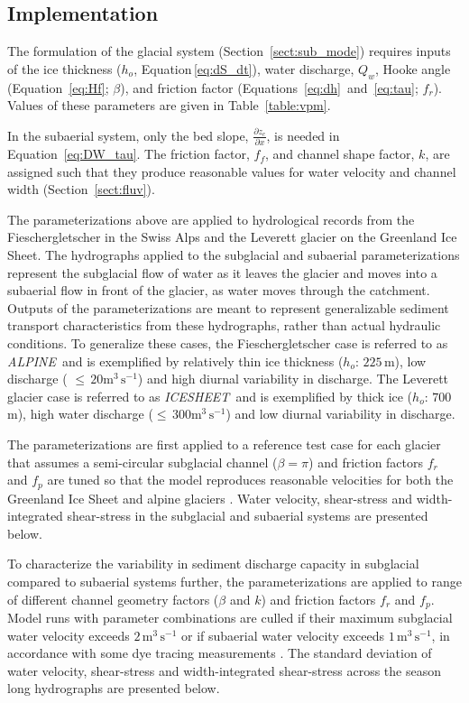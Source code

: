 \documentclass[11pt]{article}
\newcommand{\alpine}{\textit{ALPINE}\,}
\newcommand{\icesheet}{\textit{ICESHEET}\,}
\newcommand{\unit}[1]{$\mathrm{#1}$}
\begin{document}
\subsection{Implementation}

The formulation of the glacial system (Section~\ref{sect:sub_mode}) requires inputs of the ice thickness ($h_o$, Equation\,\ref{eq:dS_dt}), water discharge, $Q_w$,  Hooke angle (Equation~\ref{eq:Hf}; $\beta$), and friction factor (Equations~\ref{eq:dh}~and~\ref{eq:tau}; $f_r$). Values of these parameters are given in Table~\ref{table:vpm}.

In the subaerial system,  only the bed slope, $\frac{\partial z_c}{\partial x}$, is needed in Equation~\ref{eq:DW_tau}. The friction factor, $f_f$, and channel shape factor, $k$, are assigned such that they produce reasonable values for water velocity and channel width  (Section~\ref{sect:fluv}).

The parameterizations above are applied to hydrological records from the Fieschergletscher in the Swiss Alps and the Leverett glacier on the Greenland Ice Sheet.
The hydrographs applied to the subglacial and subaerial parameterizations represent the subglacial flow of water as it leaves the glacier and moves into a subaerial flow in front of the glacier, as water moves through the catchment.
Outputs of the parameterizations are meant to represent generalizable sediment transport characteristics from these hydrographs, rather than actual hydraulic conditions.
To generalize these cases, the Fieschergletscher case is referred to as \alpine{} and is exemplified by relatively thin ice thickness ($h_o$: $225$\,\unit{m}), low discharge ( $\le\,20$\unit{m}$^3$\,\unit{s}$^{-1}$) and high diurnal variability in discharge.
The Leverett glacier case is referred to as \icesheet{} and is exemplified by thick ice  ($h_o$: $700$\,\unit{m}), high water discharge ($\le\,300$\unit{m}$^3$\,\unit{s}$^{-1}$)  and low diurnal variability in discharge.

The parameterizations are first applied to a reference test case for each glacier that assumes a semi-circular subglacial channel ($\beta=\pi$) and friction factors $f_r$ and $f_p$ are tuned so that the model reproduces reasonable velocities for both  the Greenland Ice Sheet and alpine glaciers \citep[$\sim\,1.6\,$\unit{m}$^3$\,\unit{s}$^{-1}$][]{werder2010b,chandler2013}.
Water velocity, shear-stress and width-integrated shear-stress in the subglacial and subaerial systems are presented below.

To characterize the variability in sediment discharge capacity in subglacial compared to subaerial systems further, the parameterizations are applied to range of different channel geometry factors ($\beta$ and $k$) and friction factors $f_r$ and $f_p$.
Model runs with parameter combinations  are culled if their maximum subglacial water velocity exceeds $2\,$\unit{m}$^3$\,\unit{s}$^{-1}$ or if subaerial water velocity exceeds $1\,$\unit{m}$^3$\,\unit{s}$^{-1}$, in accordance with some dye tracing measurements \citep[e.g.]{werder2010b,chandler2013}.
The standard deviation of water velocity, shear-stress and width-integrated shear-stress across the season long hydrographs are presented below.
\end{document}
